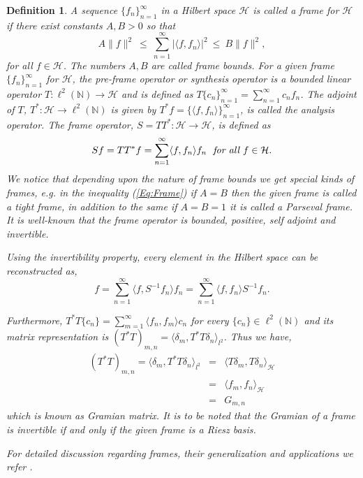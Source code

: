 \documentclass[article,12pt]{amsart}
\newtheorem{defn}[thm]{Definition}
\begin{document}
 
\begin{defn}
A sequence  $\{ f_n \}_{n=1}^\infty$ in a Hilbert space $\mathcal{H}$ is called a \emph{frame} for $\mathcal H$ if there exist constants $A,B >0$ so that 
\begin{equation}\label{Eq:Frame} A\|f\|^2~ \leq ~\sum\limits_{n=1}^\infty |\langle f,f_n\rangle|^2 ~\leq ~B\|f\|^2,
\end{equation} for all $f \in \mathcal{H}$. The numbers $A, B$ are called \emph{frame bounds}. For a given  frame $\{f_n\}_{n=1}^\infty$ for $\mathcal{H}$, the \emph{pre-frame operator} or \emph{synthesis operator} is a bounded linear operator $T: \ell^2(\mathbb N)\rightarrow \mathcal{H}$ and is defined as $T\{c_n\}_{n=1}^\infty = \sum\limits_{n=1}^\infty c_n f_n$. The adjoint of $T$, $T^*: \mathcal{H} \rightarrow \ell^2(\mathbb N)$ is  given by $T^*f = \{\langle f, f_n\rangle\}_{n=1}^\infty$, is called the \emph{analysis operator}. The \emph{frame operator}, $S=TT^*: \mathcal{H}\rightarrow \mathcal{H}$, is defined as 
\begin{equation}
Sf=TT^*f = \sum\limits_{n=1}^\infty \langle f, f_n\rangle f_n~~\emph{for~all~} f\in {\mathcal H}.
\end{equation}
We notice that depending upon the nature of frame bounds we get special kinds of frames, e.g. in the inequality (\ref{Eq:Frame}) if $A=B$ then the given frame is called a tight frame, in addition to the same if $A=B=1$ it is called a Parseval frame. It is well-known that the frame operator is bounded, positive, self adjoint and invertible.

Using the invertibility property, every element in the Hilbert space can be reconstructed as,
\begin{equation}
f=\sum\limits_{n=1}^\infty \langle f, S^{-1}f_n \rangle f_n = \sum\limits_{n=1}^\infty \langle f, f_n \rangle S^{-1}f_n.
\end{equation}

Furthermore, $T^*T\{c_n\}=\sum\limits_{m=1}^\infty \langle f_n, f_m\rangle c_n$ for every $\{c_n\} \in \ell^2(\mathbb N)$ and its matrix representation is $(T^*T)_{m,n} = \langle \delta_m, T^*T \delta_n \rangle_{l^2}$. Thus we have,
\begin{eqnarray*}
(T^*T)_{m,n} = \langle \delta_m, T^*T \delta_n \rangle_{l^2} &=& \langle T \delta_m, T \delta_n \rangle_{\mathcal H}
\\&=& \langle f_m, f_n \rangle_{\mathcal H}
\\&=& G_{m, n}
\end{eqnarray*}
which is known as Gramian matrix. It is to be noted that the Gramian of a frame is invertible if and only if the given frame is a Riesz basis.

For detailed discussion regarding frames, their generalization and applications we refer \cite{christensen2003introduction, 1, Kaf09, Gu18, 3, Po20, Ba18, Fi97, Fi98, Fi06, Fi00, Na12, Na13, Bo06, Cz02, Cz06, Ha07, Ha00, He04, An79}.
\end{defn}
\end{document}
